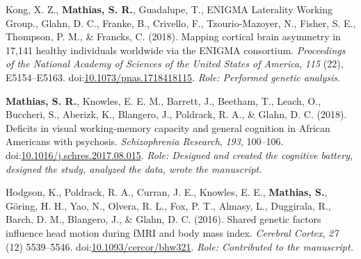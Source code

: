 \documentclass[10pt]{article}
\makeatletter
\newlength{\bibhang}
\newlength{\bibsep}
 {\@listi \global\bibsep\itemsep \global\advance\bibsep by\parsep}
\newenvironment{bibsection}%
        {\vspace{-\baselineskip}\begin{list}{}{%
       \setlength{\leftmargin}{\bibhang}%
       \setlength{\itemindent}{-\leftmargin}%
       \setlength{\itemsep}{\bibsep}%
       \setlength{\parsep}{\z@}%
        \setlength{\partopsep}{0pt}%
        \setlength{\topsep}{0pt}}}
        {\end{list}\vspace{-.6\baselineskip}}
\newcommand\doilink[1]{\href{http://dx.doi.org/#1}{#1}}
\newcommand\doi[1]{doi:\doilink{#1}}
\makeatother
\begin{document}
\begin{bibsection}
\item Kong, X. Z., \textbf{ Mathias, S. R.}, Guadalupe, T., ENIGMA Laterality Working Group., Glahn, D. C., Franke, B., Crivello, F., Tzourio-Mazoyer, N., Fisher, S. E., Thompson, P. M., \& Francks, C. (2018). Mapping cortical brain asymmetry in 17,141 healthy individuals worldwide via the ENIGMA consortium. \emph{Proceedings of the National Academy of Sciences of the United States of America}, \emph{115} (22), E5154--E5163. \doi{10.1073/pnas.1718418115}. \emph{Role: Performed genetic analysis.}

\item \textbf{Mathias, S. R.}, Knowles, E. E. M., Barrett, J., Beetham, T., Leach, O., Buccheri, S., Aberizk, K., Blangero, J., Poldrack, R. A., \& Glahn, D. C. (2018). Deficits in visual working-memory capacity and general cognition in African Americans with psychosis. \emph{Schizophrenia Research}, \emph{193}, 100--106. \doi{10.1016/j.schres.2017.08.015}.  \emph{Role: Designed and created the cognitive battery, designed the study, analyzed the data, wrote the manuscript.}

\item Hodgson, K., Poldrack, R. A., Curran, J. E., Knowles, E. E., \textbf{Mathias,  S.}, G\"oring, H. H., Yao, N., Olvera, R. L., Fox, P. T., Almasy, L., Duggirala, R., Barch, D. M., Blangero, J., \& Glahn, D. C. (2016). Shared genetic factors influence head motion during fMRI and body mass index. \emph{Cerebral Cortex}, \emph{27} (12) 5539--5546. \doi{10.1093/cercor/bhw321}. \emph{Role: Contributed to the manuscript.}


\end{bibsection}
\end{document}
